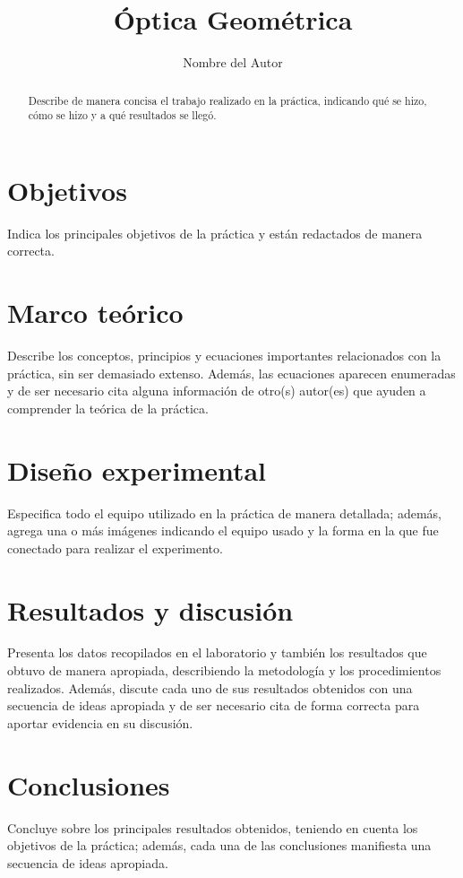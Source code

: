 \documentclass[a4paper,11pt]{scrartcl}
\title{Óptica Geométrica}
\author{Nombre del Autor}
\date{}
\begin{document}
\maketitle

\begin{abstract}
Describe de manera concisa el trabajo realizado en la práctica, indicando qué se hizo, cómo se hizo y a qué resultados se llegó.
\end{abstract}

\section{Objetivos}
Indica los principales objetivos de la práctica y están redactados de manera correcta.

\section{Marco teórico}
Describe los conceptos, principios y ecuaciones importantes relacionados con la práctica, sin ser demasiado extenso. Además, las ecuaciones aparecen enumeradas y de ser necesario cita alguna información de otro(s) autor(es) que ayuden a comprender la teórica de la práctica.

\section{Diseño experimental}
Especifica todo el equipo utilizado en la práctica de manera detallada; además, agrega una o más imágenes indicando el equipo usado y la forma en la que fue conectado para realizar el experimento.

\section{Resultados y discusión}
Presenta los datos recopilados en el laboratorio y también los resultados que obtuvo de manera apropiada, describiendo la metodología y los procedimientos realizados. Además, discute cada uno de sus resultados obtenidos con una secuencia de ideas apropiada y de ser necesario cita de forma correcta para aportar evidencia en su discusión.

\section{Conclusiones}
Concluye sobre los principales resultados obtenidos, teniendo en cuenta los objetivos de la práctica; además, cada una de las conclusiones manifiesta una secuencia de ideas apropiada.



\end{document}
